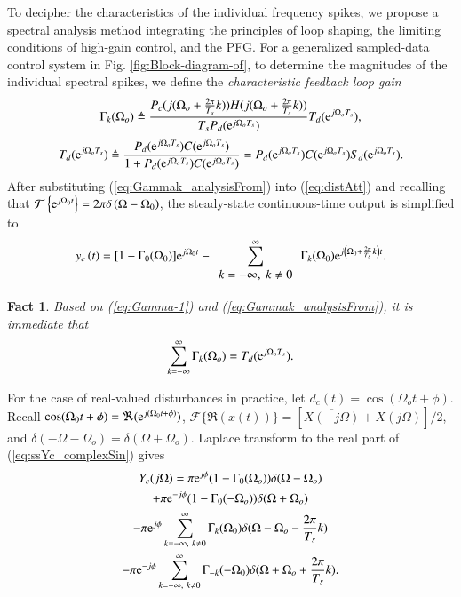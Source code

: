 \documentclass [11pt, proquest] {uwthesis}[2020/02/24]
\newtheorem{fact}{Fact}
\begin{document}
To decipher the characteristics of the individual frequency spikes,
we propose a spectral analysis method integrating the principles of
loop shaping, the limiting conditions of high-gain control, and the
PFG. For a generalized sampled-data control system in Fig. \ref{fig:Block-diagram-of},
to determine the magnitudes of the individual spectral spikes, we
define the \emph{characteristic feedback loop gain}
\begin{equation}
\Gamma_{k}(\Omega_{o})\triangleq\frac{P_{c}(j(\Omega_{o}+\frac{2\pi}{T_{s}}k))H(j(\Omega_{o}+\frac{2\pi}{T_{s}}k))}{T_{s}P_{d}(\mathrm{e}^{j\Omega_{o}T_{s}})}T_{d}(\mathrm{e}^{j\Omega_{o}T_{s}}),\label{eq:Gammak_analysisFrom}
\end{equation}
\noindent
\begin{equation}
T_{d}(\mathrm{e}^{j\Omega_{o}T_{s}})\triangleq\frac{P_{d}(\mathrm{e}^{j\Omega_{o}T_{s}})C(\mathrm{e}^{j\Omega_{o}T_{s}})}{1+P_{d}(\mathrm{e}^{j\Omega_{o}T_{s}})C(\mathrm{e}^{j\Omega_{o}T_{s}})}=P_{d}(\mathrm{e}^{j\Omega_{o}T_{s}})C(\mathrm{e}^{j\Omega_{o}T_{s}})S_{d}(\mathrm{e}^{j\Omega_{o}T_{s}}).\label{eq:Td}
\end{equation}
After substituting (\ref{eq:Gammak_analysisFrom}) into (\ref{eq:distAtt})
and recalling that $\mathcal{F}\left\{ \mathrm{e}^{j\Omega_{0}t}\right\} =2\pi\delta\left(\Omega-\Omega_{0}\right)$,
the steady-state continuous-time output is simplified to
\begin{equation}
y_{c}\left(t\right)=[1-\Gamma_{0}(\Omega_{0})]\e^{j\Omega_{0}t}-\sum_{\begin{array}{c}
k=-\infty,\ k\neq0\end{array}}^{\infty}\Gamma_{k}(\Omega_{0})\e^{j\left(\Omega_{0}+\frac{2\pi}{T_{s}}k\right)t}.\label{eq:ssYc_complexSin}
\end{equation}

\begin{fact}\label{fact_1}Based on (\ref{eq:Gamma-1}) and (\ref{eq:Gammak_analysisFrom}),
it is immediate that
\begin{equation}
\sum_{k=-\infty}^{\infty}\Gamma_{k}(\Omega_{o})=T_{d}(\mathrm{e}^{j\Omega_{o}T_{s}}).\label{eq:summation_of_gammark}
\end{equation}
\end{fact}

For the case of real-valued disturbances in practice, let $d_{c}(t)=\cos(\Omega_{o}t+\phi)$.
Recall $\cos(\Omega_{0}t+\phi)=\Re(\mathrm{e}^{j(\Omega_{0}t+\phi)})$, $\mathcal{F}\{\Re(x(t))\}=[\overline{X(-j\Omega)}+X(j\Omega)]/2$,
and $\delta(-\Omega-\Omega_{o})=\delta(\Omega+\Omega_{o})$. Laplace
transform to the real part of (\ref{eq:ssYc_complexSin}) gives
\begin{multline}
Y_{c}(j\Omega)=\pi\e^{j\phi}(1-\Gamma_{0}(\Omega_{o}))\delta(\Omega-\Omega_{o})\\
+\pi\e^{-j\phi}(1-\Gamma_{0}(-\Omega_{o}))\delta(\Omega+\Omega_{o})\\
-\pi\e^{j\phi}\sum_{k=-\infty,\ k\neq0}^{\infty}\Gamma_{k}(\Omega_{0})\delta(\Omega-\Omega_{o}-\frac{2\pi}{T_{s}}k)\\
-\pi\e^{-j\phi}\sum_{k=-\infty,\ k\neq0}^{\infty}\Gamma_{-k}(-\Omega_{0})\delta(\Omega+\Omega_{o}+\frac{2\pi}{T_{s}}k).\label{eq:Ycind_realSin}
\end{multline}
\end{document}
